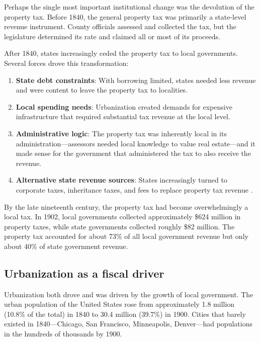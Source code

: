 \documentclass[12pt]{article}
\begin{document}
Perhaps the single most important institutional change was the devolution of the property tax.  Before 1840, the general property tax was primarily a state-level revenue instrument.  County officials assessed and collected the tax, but the legislature determined its rate and claimed all or most of its proceeds.

After 1840, states increasingly ceded the property tax to local governments.  Several forces drove this transformation:

\begin{enumerate}
    \item \textbf{State debt constraints}: With borrowing limited, states needed less revenue and were content to leave the property tax to localities.

    \item \textbf{Local spending needs}: Urbanization created demands for expensive infrastructure that required substantial tax revenue at the local level.

    \item \textbf{Administrative logic}: The property tax was inherently local in its administration---assessors needed local knowledge to value real estate---and it made sense for the government that administered the tax to also receive the revenue.

    \item \textbf{Alternative state revenue sources}: States increasingly turned to corporate taxes, inheritance taxes, and fees to replace property tax revenue \citep{wallis2001property}.
\end{enumerate}

By the late nineteenth century, the property tax had become overwhelmingly a local tax.  In 1902, local governments collected approximately \$624 million in property taxes, while state governments collected roughly \$82 million.  The property tax accounted for about 73\% of all local government revenue but only about 40\% of state government revenue.

\subsection{Urbanization as a fiscal driver}

Urbanization both drove and was driven by the growth of local government.  The urban population of the United States rose from approximately 1.8 million (10.8\% of the total) in 1840 to 30.4 million (39.7\%) in 1900.  Cities that barely existed in 1840---Chicago, San Francisco, Minneapolis, Denver---had populations in the hundreds of thousands by 1900.
\end{document}
